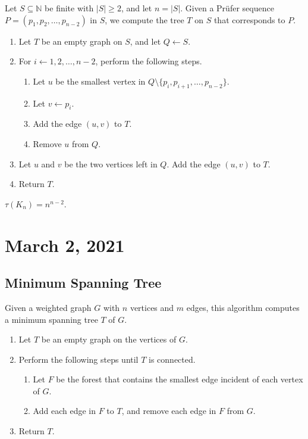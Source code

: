 \documentclass[11pt]{article}
\newcommand{\NN}{\mathbb{N}}
\begin{document}
\begin{algorithm}[Decoding]
  Let $S \subseteq \NN$ be finite with $|S| \geq 2$, and let $n = |S|$.
  Given a Pr\"ufer sequence $P = (p_1, p_2, \dots, p_{n-2})$ in $S$, we compute the tree $T$ on $S$ that corresponds to $P$.
  \begin{enumerate}[label=\arabic*.]
    \item Let $T$ be an empty graph on $S$, and let $Q \gets S$.
    \item For $i \gets 1, 2, \dots, n-2$, perform the following steps.
    \begin{enumerate}[label*=\arabic*.]
      \item Let $u$ be the smallest vertex in $Q \setminus \{p_i, p_{i+1}, \dots, p_{n-2}\}$.
      \item Let $v \gets p_i$.
      \item Add the edge $(u, v)$ to $T$.
      \item Remove $u$ from $Q$.
    \end{enumerate}
    \item Let $u$ and $v$ be the two vertices left in $Q$.
    Add the edge $(u, v)$ to $T$.
    \item Return $T$.
  \end{enumerate}
\end{algorithm}

\begin{theorem}
  $\tau(K_n) = n^{n-2}$.
\end{theorem}

\section{March 2, 2021}
\subsection{Minimum Spanning Tree}
\begin{algorithm}[Boru\r{v}ka]
  Given a weighted graph $G$ with $n$ vertices and $m$ edges, this algorithm computes a minimum spanning tree $T$ of $G$.
  \begin{enumerate}[label*=\arabic*.]
    \item Let $T$ be an empty graph on the vertices of $G$.
    \item Perform the following steps until $T$ is connected.
    \begin{enumerate}[label*=\arabic*.]
      \item Let $F$ be the forest that contains the smallest edge incident of each vertex of $G$.
      \item Add each edge in $F$ to $T$, and remove each edge in $F$ from $G$.
    \end{enumerate}
    \item Return $T$.
  \end{enumerate}
\end{algorithm}
\end{document}

